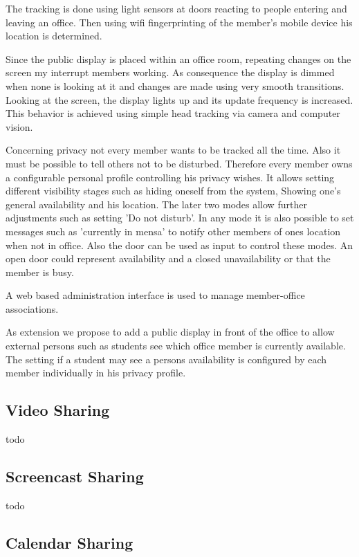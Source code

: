 The tracking is done using light sensors at doors reacting to people entering and leaving an office.
Then using wifi fingerprinting of the member's mobile device his location is determined.

Since the public display is placed within an office room, repeating changes on the screen my interrupt members working.
As consequence the display is dimmed when none is looking at it and changes are made using very smooth transitions.
Looking at the screen, the display lights up and its update frequency is increased.
This behavior is achieved using simple head tracking via camera and computer vision.

Concerning privacy not every member wants to be tracked all the time.
Also it must be possible to tell others not to be disturbed.
Therefore every member owns a configurable personal profile controlling his privacy wishes.
It allows setting different visibility stages such as hiding oneself from the system,
Showing one's general availability and his location.
The later two modes allow further adjustments such as setting 'Do not disturb'.
In any mode it is also possible to set messages such as 'currently in mensa' to notify other members of ones location when not in office.
Also the door can be used as input to control these modes.
An open door could represent availability and a closed unavailability or that the member is busy.

A web based administration interface is used to manage member-office associations.

As extension we propose to add a public display in front of the office to allow external persons such as students see which office member is currently available.
The setting if a student may see a persons availability is configured by each member individually in his privacy profile.



\subsection{Video Sharing}

todo

\subsection{Screencast Sharing}

todo

\subsection{Calendar Sharing}

